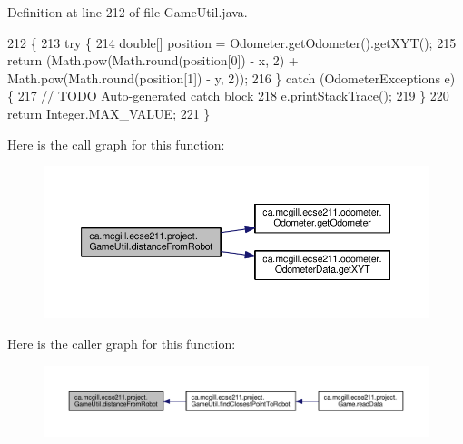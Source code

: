 Definition at line 212 of file Game\+Util.\+java.


\begin{DoxyCode}
212                                                        \{
213     \textcolor{keywordflow}{try} \{
214       \textcolor{keywordtype}{double}[] position = Odometer.getOdometer().getXYT();
215       \textcolor{keywordflow}{return} (Math.pow(Math.round(position[0]) - x, 2) + Math.pow(Math.round(position[1]) - y, 2));
216     \} \textcolor{keywordflow}{catch} (OdometerExceptions e) \{
217       \textcolor{comment}{// TODO Auto-generated catch block}
218       e.printStackTrace();
219     \}
220     \textcolor{keywordflow}{return} Integer.MAX\_VALUE;
221   \}
\end{DoxyCode}
Here is the call graph for this function\+:\nopagebreak
\begin{figure}[H]
\begin{center}
\leavevmode
\includegraphics[width=350pt]{classca_1_1mcgill_1_1ecse211_1_1project_1_1_game_util_ae373ebc3ec91ed3bf9dd7304a482a3f5_cgraph}
\end{center}
\end{figure}
Here is the caller graph for this function\+:\nopagebreak
\begin{figure}[H]
\begin{center}
\leavevmode
\includegraphics[width=350pt]{classca_1_1mcgill_1_1ecse211_1_1project_1_1_game_util_ae373ebc3ec91ed3bf9dd7304a482a3f5_icgraph}
\end{center}
\end{figure}
\mbox{\label{classca_1_1mcgill_1_1ecse211_1_1project_1_1_game_util_a6e0ee94b800ca3727ca8009782abda14}} 
